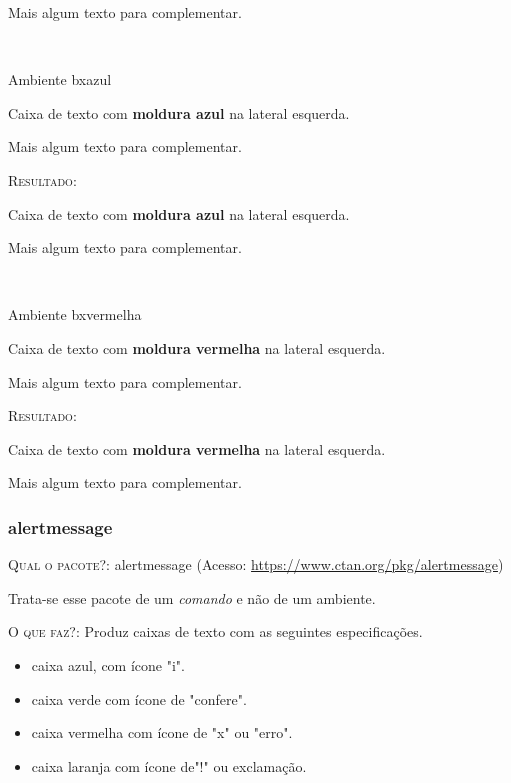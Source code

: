 \documentclass[a4paper,12pt,oneside,openright,extrafontsizes,openbib]{memoir}
\begin{document}
{\begin{bxcinza}
	Mais algum texto para complementar.  
\end{bxcinza}
\ \\

\begin{codex}{Ambiente bxazul}
	\begin{bxazul}
	Caixa de texto com \textbf{moldura azul} na lateral esquerda. 
	
	Mais algum texto para complementar.  
	\end{bxazul}
\end{codex}

 \textsc{Resultado:}
\begin{bxazul}
	Caixa de texto com \textbf{moldura azul} na lateral esquerda. 
	
	Mais algum texto para complementar.  
\end{bxazul}
\ \\

\begin{codex}{Ambiente bxvermelha}
	\begin{bxvermelha}
	Caixa de texto com \textbf{moldura vermelha} na lateral esquerda. 
		
	Mais algum texto para complementar.  
	\end{bxvermelha}
\end{codex}

\textsc{Resultado:}
\begin{bxvermelha}
	Caixa de texto com \textbf{moldura vermelha} na lateral esquerda. 
	
	Mais algum texto para complementar.  
\end{bxvermelha}


\subsubsection{alertmessage}

\textsc{Qual o pacote?}: alertmessage (Acesso: \url{https://www.ctan.org/pkg/alertmessage})

Trata-se esse pacote de um \textit{comando} e não de um ambiente.

\textsc{O que faz?}: Produz caixas de texto com as seguintes especificações.

\begin{itemize}
\item caixa azul, com ícone "i".
\item caixa verde com ícone de "confere".
\item caixa vermelha com ícone de "x" ou "erro".
\item caixa laranja com ícone de"!" ou exclamação.
\end{itemize}


}
\end{document}
